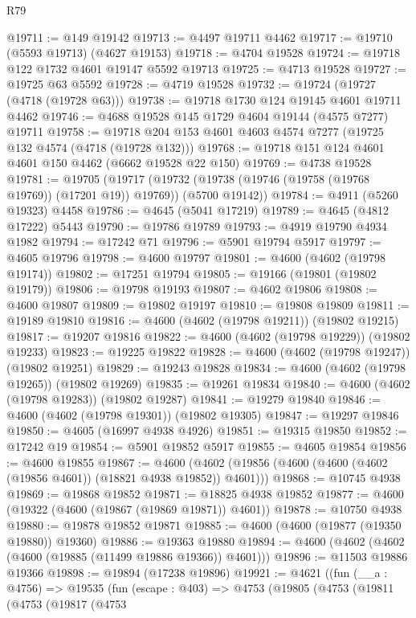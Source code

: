 \begin{lexlean}{R79}
\begin{coremodule}
@19711 := @149 @19142
@19713 := @4497 @19711 @4462
@19717 := @19710 (@5593 @19713) (@4627 @19153)
@19718 := @4704 @19528
@19724 := @19718 @122 @1732 @4601 @19147 @5592 @19713
@19725 := @4713 @19528
@19727 := @19725 @63 @5592
@19728 := @4719 @19528
@19732 := @19724 (@19727 (@4718 (@19728 @63)))
@19738 := @19718 @1730 @124 @19145 @4601 @19711 @4462
@19746 := @4688 @19528 @145 @1729 @4604 @19144 (@4575 @7277) @19711
@19758 := @19718 @204 @153 @4601 @4603 @4574 @7277 (@19725 @132 @4574 (@4718 (@19728 @132)))
@19768 := @19718 @151 @124 @4601 @4601 @150 @4462 (@6662 @19528 @22 @150)
@19769 := @4738 @19528
@19781 := @19705
    (@19717 (@19732 (@19738 (@19746 (@19758 (@19768 @19769)) (@17201 @19)) @19769)) (@5700 @19142))
@19784 := @4911 (@5260 @19323) @4458
@19786 := @4645 (@5041 @17219)
@19789 := @4645 (@4812 @17222) @5443
@19790 := @19786 @19789
@19793 := @4919 @19790 @4934 @1982
@19794 := @17242 @71
@19796 := @5901 @19794 @5917
@19797 := @4605 @19796
@19798 := @4600 @19797
@19801 := @4600 (@4602 (@19798 @19174))
@19802 := @17251 @19794
@19805 := @19166 (@19801 (@19802 @19179))
@19806 := @19798 @19193
@19807 := @4602 @19806
@19808 := @4600 @19807
@19809 := @19802 @19197
@19810 := @19808 @19809
@19811 := @19189 @19810
@19816 := @4600 (@4602 (@19798 @19211)) (@19802 @19215)
@19817 := @19207 @19816
@19822 := @4600 (@4602 (@19798 @19229)) (@19802 @19233)
@19823 := @19225 @19822
@19828 := @4600 (@4602 (@19798 @19247)) (@19802 @19251)
@19829 := @19243 @19828
@19834 := @4600 (@4602 (@19798 @19265)) (@19802 @19269)
@19835 := @19261 @19834
@19840 := @4600 (@4602 (@19798 @19283)) (@19802 @19287)
@19841 := @19279 @19840
@19846 := @4600 (@4602 (@19798 @19301)) (@19802 @19305)
@19847 := @19297 @19846
@19850 := @4605 (@16997 @4938 @4926)
@19851 := @19315 @19850
@19852 := @17242 @19
@19854 := @5901 @19852 @5917
@19855 := @4605 @19854
@19856 := @4600 @19855
@19867 := @4600 (@4602 (@19856 (@4600 (@4600 (@4602 (@19856 @4601)) (@18821 @4938 @19852)) @4601)))
@19868 := @10745 @4938
@19869 := @19868 @19852
@19871 := @18825 @4938 @19852
@19877 := @4600 (@19322 (@4600 (@19867 (@19869 @19871)) @4601))
@19878 := @10750 @4938
@19880 := @19878 @19852 @19871
@19885 := @4600 (@4600 (@19877 (@19350 @19880)) @19360)
@19886 := @19363 @19880
@19894 := @4600 (@4602 (@4602 (@4600 (@19885 (@11499 @19886 @19366)) @4601)))
@19896 := @11503 @19886 @19366
@19898 := @19894 (@17238 @19896)
@19921 := @4621
    ((fun (__a : @4756) =>
    @19535
      (fun (escape : @403) =>
      @4753
        (@19805
          (@4753
            (@19811
              (@4753
                (@19817
                  (@4753

\end{coremodule}
\end{lexlean}
